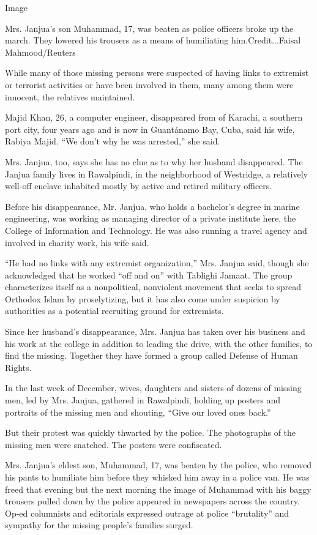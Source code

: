 Image

Mrs. Janjua's son Muhammad, 17, was beaten as police officers broke up
the march. They lowered his trousers as a means of humiliating
him.Credit...Faisal Mahmood/Reuters

While many of those missing persons were suspected of having links to
extremist or terrorist activities or have been involved in them, many
among them were innocent, the relatives maintained.

Majid Khan, 26, a computer engineer, disappeared from of Karachi, a
southern port city, four years ago and is now in Guantánamo Bay, Cuba,
said his wife, Rabiya Majid. ``We don't why he was arrested,'' she said.

Mrs. Janjua, too, says she has no clue as to why her husband
disappeared. The Janjua family lives in Rawalpindi, in the neighborhood
of Westridge, a relatively well-off enclave inhabited mostly by active
and retired military officers.

Before his disappearance, Mr. Janjua, who holds a bachelor's degree in
marine engineering, was working as managing director of a private
institute here, the College of Information and Technology. He was also
running a travel agency and involved in charity work, his wife said.

``He had no links with any extremist organization,'' Mrs. Janjua said,
though she acknowledged that he worked ``off and on'' with Tablighi
Jamaat. The group characterizes itself as a nonpolitical, nonviolent
movement that seeks to spread Orthodox Islam by proselytizing, but it
has also come under suspicion by authorities as a potential recruiting
ground for extremists.

Since her husband's disappearance, Mrs. Janjua has taken over his
business and his work at the college in addition to leading the drive,
with the other families, to find the missing. Together they have formed
a group called Defense of Human Rights.

In the last week of December, wives, daughters and sisters of dozens of
missing men, led by Mrs. Janjua, gathered in Rawalpindi, holding up
posters and portraits of the missing men and shouting, ``Give our loved
ones back.''

But their protest was quickly thwarted by the police. The photographs of
the missing men were snatched. The posters were confiscated.

Mrs. Janjua's eldest son, Muhammad, 17, was beaten by the police, who
removed his pants to humiliate him before they whisked him away in a
police van. He was freed that evening but the next morning the image of
Muhammad with his baggy trousers pulled down by the police appeared in
newspapers across the country. Op-ed columnists and editorials expressed
outrage at police ``brutality'' and sympathy for the missing people's
families surged.

